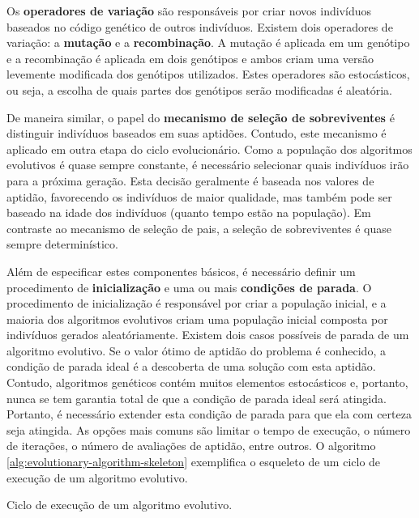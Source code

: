Os \textbf{operadores de variação} são responsáveis por criar novos indivíduos
baseados no código genético de outros indivíduos. Existem dois operadores de
variação: a \textbf{mutação} e a \textbf{recombinação}. A mutação é aplicada em
um genótipo e a recombinação é aplicada em dois genótipos e ambos criam uma
versão levemente modificada dos genótipos utilizados. Estes operadores são
estocásticos, ou seja, a escolha de quais partes dos genótipos serão modificadas
é aleatória.

De maneira similar, o papel do \textbf{mecanismo de seleção de sobreviventes} é
distinguir indivíduos baseados em suas aptidões. Contudo, este mecanismo é
aplicado em outra etapa do ciclo evolucionário. Como a população dos algoritmos
evolutivos é quase sempre constante, é necessário selecionar quais indivíduos
irão para a próxima geração. Esta decisão geralmente é baseada nos valores de
aptidão, favorecendo os indivíduos de maior qualidade, mas também pode ser
baseado na idade dos indivíduos (quanto tempo estão na população). Em contraste
ao mecanismo de seleção de pais, a seleção de sobreviventes é quase sempre
determinístico.

Além de especificar estes componentes básicos, é necessário definir um
procedimento de \textbf{inicialização} e uma ou mais \textbf{condições de
parada}. O procedimento de inicialização é responsável por criar a população
inicial, e a maioria dos algoritmos evolutivos criam uma população inicial
composta por indivíduos gerados aleatóriamente. Existem dois casos possíveis de
parada de um algoritmo evolutivo. Se o valor ótimo de aptidão do problema é
conhecido, a condição de parada ideal é a descoberta de uma solução com esta
aptidão. Contudo, algoritmos genéticos contém muitos elementos estocásticos e,
portanto, nunca se tem garantia total de que a condição de parada ideal será
atingida. Portanto, é necessário extender esta condição de parada para que ela
com certeza seja atingida. As opções mais comuns são limitar o tempo de
execução, o número de iterações, o número de avaliações de aptidão, entre
outros. O algoritmo \ref{alg:evolutionary-algorithm-skeleton} exemplifica o
esqueleto de um ciclo de execução de um algoritmo evolutivo.

\begin{algorithm}[h]
\begin{center}
	\begin{algorithmic}[1]
		\REPEAT
    \end{algorithmic}
\end{center}
\caption{Ciclo de execução de um algoritmo evolutivo.}
\label{alg:evolutionary-algorithm-skeleton}
\end{algorithm}

